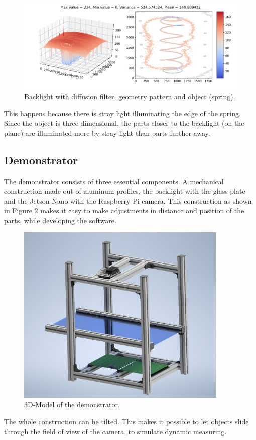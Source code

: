 \begin{figure}[ht]
	\centering
	\includegraphics[trim=50 0 0 0,clip,width=0.9\linewidth]{3-development/backlight/3d4.png}
	\caption{Backlight with diffusion filter, geometry pattern and object (spring).\label{development:3d4}}
\end{figure} 
This happens because there is stray light illuminating the edge of the spring.
Since the object is three dimensional, the parts closer to the backlight (on the plane) are illuminated more by stray light than parts further away.

\subsection{Demonstrator}
The demonstrator consists of three essential components.
A mechanical construction made out of aluminum profiles, the backlight with the glass plate and the Jetson Nano with the Raspberry Pi camera.  
This construction as shown in Figure \ref{development:demo} makes it easy to make adjustments in distance and position of the parts, while developing the software.
\begin{figure}[ht]
	\centering
	\includegraphics[width=0.9\textwidth]{3-development/images/Demonstrator.png}
	\caption{3D-Model of the demonstrator.\label{development:demo}}
\end{figure} 
The whole construction can be tilted.
This makes it possible to let objects slide through the field of view of the camera, to simulate dynamic measuring.


